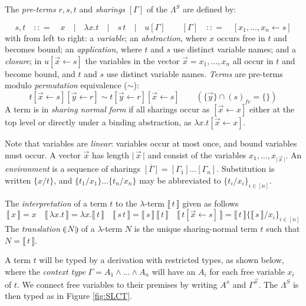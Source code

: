 \documentclass[a4paper,UKenglish,cleveref, autoref]{lipics-v2019}
\newcommand{\SLC}{\Lambda^{S}}
\newcommand{\fv}[1]{(#1)_{fv}}
\newcommand{\set}[1]{ \{ #1 \} }
\newcommand{\abs}[2]{\lambda #1 . #2}
\newcommand{\app}[2]{#1 \, #2}
\newcommand{\share}[3]{#1 [#2 \leftarrow #3]}
\newcommand{\size}[1]{\vert \, #1 \, \vert}
\newcommand{\sub}[3]{#1 \{ #2 / #3 \}}
\newcommand{\compile}[1]{\llparenthesis \, #1 \, \rrparenthesis}
\newcommand{\readbackclose}[1]{\llbracket \, #1 \, \rrbracket }
\begin{document}
\begin{definition}
\label{def:sharingcalsyntax}
The \emph{pre-terms} $r, s, t$ and \emph{sharings} $[\Gamma]$ of the $\SLC$ are defined by:

$$s, t \quad {:}{:}{=} \quad x \quad \vert \quad \abs{x}{t} \quad \vert \quad \app{s}{t} \quad \vert \quad u[\Gamma] \quad \quad [\Gamma] \quad {:}{:}{=} \quad \share{}{x_{1}, \dots, x_{n}}{s}$$
with from left to right: a \emph{variable}; an \emph{abstraction}, where $x$ occurs free in $t$ and becomes bound; an \emph{application}, where $t$ and $s$ use distinct variable names; and a \emph{closure}; in $\share{u}{\vec{x}}{s}$ the variables in the vector $\vec{x} = x_{1}, \dots, x_{n}$ all occur in $t$ and become bound, and $t$ and $s$ use distinct variable names. \emph{Terms} are pre-terms modulo \emph{permutation} equivalence ($\sim$):
$$\share{t}{\vec{x}}{s} \share{}{\vec{y}}{r} \sim t \share{}{\vec{y}}{r} \share{}{\vec{x}}{s} \quad \quad (\set{\vec{y}} \cap \fv{s} = \set{} )$$
A term is in \emph{sharing normal form} if all sharings occur as $\share{}{\vec{x}}{x}$ either at the top level or directly under a binding abstraction, as $\abs{x}{\share{t}{\vec{x}}{x}}$.
\end{definition}

\noindent Note that variables are \emph{linear}: variables occur at most once, and bound variables must occur. A vector $\vec{x}$ has length $\size{\vec{x}}$ and consist of the variables $x_{1}, \dots, x_{\size{\vec{x}}}$. An \emph{environment} is a sequence of sharings $\overline{[\Gamma]} = [\Gamma_{1}] \dots [\Gamma_{n}]$. Substitution is written $\sub{}{x}{t}$, and $\sub{}{t_{1}}{x_{1}} \dots \sub{}{t_{n}}{x_{n}}$ may be abbreviated to $\sub{}{t_{i}}{x_{i}}_{i \in [n]}$.

\begin{definition}
The \emph{interpretation} of a term $t$ to the $\lambda$-term $\readbackclose{t}$ given as follows
$$\readbackclose{x} = x \quad \readbackclose{\abs{x}{t}} = \abs{x}{\readbackclose{t}} \quad \readbackclose{\app{s}{t}} = \app{\readbackclose{s}}{\readbackclose{t}} \quad \readbackclose{\share{t}{\vec{x}}{s}} = \readbackclose{t} \sub{}{\readbackclose{s}}{x_{i}}_{i \in [n]}$$
The \emph{translation} $\compile{N}$ of a $\lambda$-term $N$ is the unique sharing-normal term $t$ such that $N = \readbackclose{t}$.
\end{definition}

A term $t$ will be typed by a derivation with restricted types, as shown below, where the \emph{context type} $\Gamma = A_{1} \wedge \dots \wedge A_{n}$ will have an $A_{i}$ for each free variable $x_{i}$ of $t$. We connect free variables to their premises by writing $A^{x}$ and $\Gamma^{\vec{x}}$. The $\SLC$ is then typed as in Figure \ref{fig:SLCT}.
\end{document}
